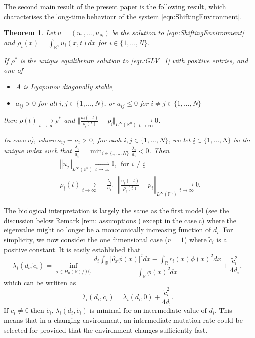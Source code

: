 \documentclass{article}
\newtheorem{theorem}{Theorem}[section]
\begin{document}
The second main result of the present paper is the following result, which characterises the long-time behaviour of the system \eqref{eqn:ShiftingEnvironment}. 
\begin{theorem}\label{thm:Global_attractors_UBD}
Let $u=(u_1,...,u_N)$ be the solution to \eqref{eqn:ShiftingEnvironment} and $\rho_i(x)=\int_{\mathbb{R}^n}u_i(x,t)dx$ for $i\in\{1,...,N\}$. 


If $\rho^{*}$ is the unique equilibrium solution to \eqref{eqn:GLV_1} with positive entries, and one of
\begin{itemize}
    \item[a)]  $A$ is Lyapunov diagonally stable,
    \item[b)]  $a_{ij}>0$ for all $i,j\in\{1,...,N\}$, or $a_{ij}\leq{0}$ for $i\neq{j}\in\{1,...,N\}$
\end{itemize}
then $\rho(t)\xrightarrow[t\rightarrow\infty]{}\rho^{*}$ and $\Vert{}\frac{u_i(\cdot,t)}{\rho_i(t)}-p_i\Vert_{L^\infty(\mathbb{R}^n)}\xrightarrow[t\rightarrow\infty]{}0$.

In case c), where $a_{ij}=a_i>0$,  for each $i,j\in\{1,...,N\}$, we let $\underline{i}\in\{1,...,N\}$ be the unique index such that $\frac{\lambda_{\underline{i}}}{a_{\underline{i}}}=\min_{i\in\{1,...,N\}}\frac{\lambda_i}{a_i}<0$. Then
   \begin{align*}
       &\left\Vert{u_j}\right\Vert_{L^\infty(\mathbb{R}^n)}\xrightarrow[t\rightarrow\infty]{}0,~~\text{for }i\neq{}\underline{i}\\
       &\rho_{\underline{i}}(t)\xrightarrow[t\rightarrow\infty]{}-\frac{\lambda_{\underline{i}}}{a_i},~~ \left\Vert{}\frac{u_{\underline{i}}(\cdot,t)}{\rho_{\underline{i}}(t)}-p_i\right\Vert_{L^\infty(\mathbb{R}^n)}\xrightarrow[t\rightarrow\infty]{}0.
   \end{align*}



\end{theorem}


    
The biological interpretation is largely the same as the first model (see the discussion below Remark \ref{rem: assumptions}) except in the case c) where the eigenvalue might no longer be a monotonically increasing function of $d_i$. {For simplicity, we now consider the one dimensional case ($n=1$) where $\tilde{c}_i$ is a positive constant.} It is easily established \cite{iglesias2021selection,adaptivedynamicsdivergingfitness} that
\begin{equation}\label{eqn:RayleighUBD}
    \lambda_i(d_i,\tilde{c}_i)=\inf_{\phi\in{}H_0^1(\mathbb{R})/\{0\}}\frac{d_i\int_{\mathbb{R}}|\partial_{x}\phi(x)|^2dx-\int_{\mathbb{R}}r_i(x)\phi(x)^2dx}{\int_{\mathbb{R}}\phi(x)^2dx}+\frac{\tilde{c}_i^2}{4d_i},
\end{equation}
which can be written as
\[\lambda_i(d_i,\tilde{c}_i)=\lambda_i(d_i,0)+\frac{\tilde{c}_i^2}{4d_i}.\]
If $c_i\neq{0}$ then $\tilde{c}_i$, $\lambda_{i}(d_i,\tilde{c}_i)$ is minimal for an intermediate value of $d_i$. This means that in a changing environment, an intermediate mutation rate could be selected for provided that the environment changes sufficiently fast.
\end{document}
